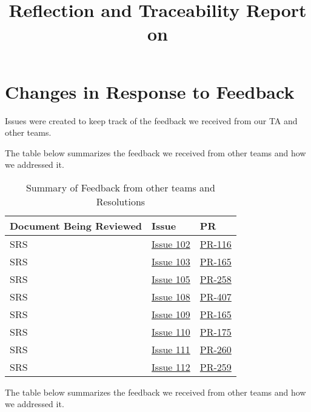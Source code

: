 \documentclass{article}
\title{Reflection and Traceability Report on \progname}
\author{\authname}
\date{}
\begin{document}
\maketitle

\section{Changes in Response to Feedback}

Issues were created to keep track of the feedback we received from our TA and other teams.

The table below summarizes the feedback we received from other teams and how we addressed it.

\begin{table}[h!]
\centering
\begin{tabularx}{\textwidth}{lXl}
\toprule
\textbf{Document Being Reviewed} & \textbf{Issue} & \textbf{PR} \\
\midrule
SRS & \href{https://github.com/SyntaxSentinels/SyntaxSentinels/issues/102}{Issue 102} & \href{https://github.com/SyntaxSentinels/SyntaxSentinels/pull/116}{PR-116} \\
SRS & \href{https://github.com/SyntaxSentinels/SyntaxSentinels/issues/103}{Issue 103} & \href{https://github.com/SyntaxSentinels/SyntaxSentinels/pull/165}{PR-165} \\
SRS & \href{https://github.com/SyntaxSentinels/SyntaxSentinels/issues/105}{Issue 105} & \href{https://github.com/SyntaxSentinels/SyntaxSentinels/pull/258}{PR-258} \\
SRS & \href{https://github.com/SyntaxSentinels/SyntaxSentinels/issues/108}{Issue 108} & \href{https://github.com/SyntaxSentinels/SyntaxSentinels/pull/407}{PR-407} \\
SRS & \href{https://github.com/SyntaxSentinels/SyntaxSentinels/issues/109}{Issue 109} & \href{https://github.com/SyntaxSentinels/SyntaxSentinels/pull/165}{PR-165} \\
SRS & \href{https://github.com/SyntaxSentinels/SyntaxSentinels/issues/110}{Issue 110} & \href{https://github.com/SyntaxSentinels/SyntaxSentinels/pull/175}{PR-175} \\
SRS & \href{https://github.com/SyntaxSentinels/SyntaxSentinels/issues/111}{Issue 111} & \href{https://github.com/SyntaxSentinels/SyntaxSentinels/pull/260}{PR-260} \\
SRS & \href{https://github.com/SyntaxSentinels/SyntaxSentinels/issues/112}{Issue 112} & \href{https://github.com/SyntaxSentinels/SyntaxSentinels/pull/259}{PR-259} \\

\bottomrule
\end{tabularx}
\caption{Summary of Feedback from other teams and Resolutions}
\label{tab:peer_feedback_summary}
\end{table}
\newpage
The table below summarizes the feedback we received from other teams and how we addressed it.
\end{document}
